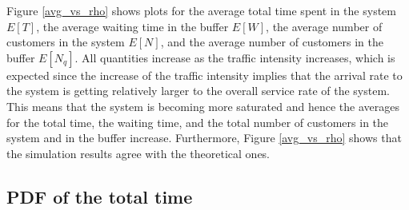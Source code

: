 \documentclass[12pt, a4paper]{article}
\begin{document}
Figure \ref{avg_vs_rho} shows plots for the average total time spent 
in the system $E[T]$, the average waiting time in  the buffer $E[W]$,
the average number of customers in the system $E[N]$, and the average 
number of customers in the buffer $E[N_q]$. All quantities increase as
the traffic intensity increases, which is expected since the increase 
of the traffic intensity implies that the arrival rate to the system is 
getting relatively larger to the overall service rate of the system. This means 
that the system is becoming more saturated and hence the averages for 
the total time, the waiting time, and the total number of customers
in the system and in the buffer increase. Furthermore, Figure \ref{avg_vs_rho} 
shows that the simulation results agree with the theoretical ones.

\subsection{PDF of the total time}
\end{document}

